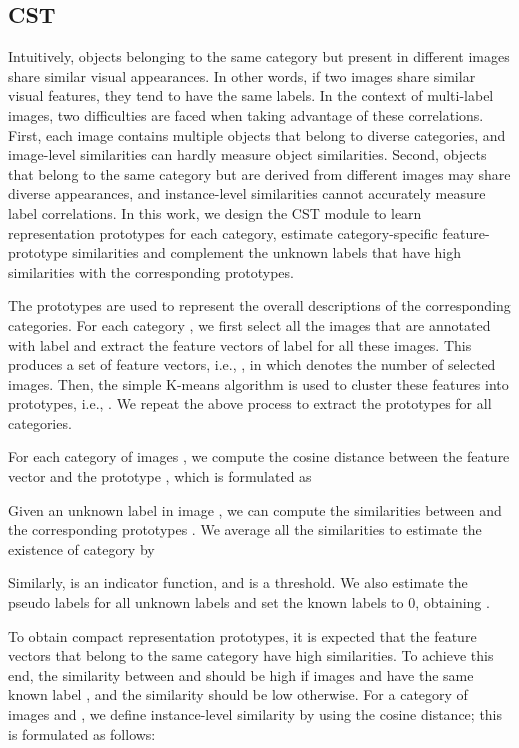 \subsection{CST}
\label{sec:cst}
Intuitively, objects belonging to the same category but present in different images share similar visual appearances. In other words, if two images share similar visual features, they tend to have the same labels. In the context of multi-label images, two difficulties are faced when taking advantage of these correlations. First, each image contains multiple objects that belong to diverse categories, and image-level similarities can hardly measure object similarities. Second, objects that belong to the same category but are derived from different images may share diverse appearances, and instance-level similarities cannot accurately measure label correlations. In this work, we design the CST module to learn representation prototypes for each category, estimate category-specific feature-prototype similarities and complement the unknown labels that have high similarities with the corresponding prototypes.

The prototypes are used to represent the overall descriptions of the corresponding categories. For each category , we first select all the images that are annotated with label  and extract the feature vectors of label  for all these images. This produces a set of feature vectors, i.e., , in which  denotes the number of selected images. Then, the simple K-means algorithm is used to cluster these features into  prototypes, i.e., . We repeat the above process to extract the prototypes for all categories.

For each category  of images , we compute the cosine distance between the feature vector  and the prototype , which is formulated as


Given an unknown label  in image , we can compute the similarities between  and the corresponding prototypes . We average all the similarities to estimate the existence of category  by

Similarly,  is an indicator function, and  is a threshold. We also estimate the pseudo labels for all unknown labels and set the known labels to 0, obtaining .

To obtain compact representation prototypes, it is expected that the feature vectors that belong to the same category have high similarities. To achieve this end, the similarity between  and  should be high if images  and  have the same known label , and the similarity should be low otherwise. For a category  of images  and , we define instance-level similarity by using the cosine distance; this is formulated as follows:

